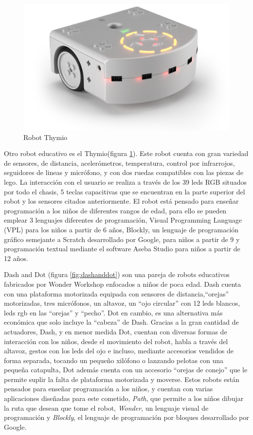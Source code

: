   \begin{figure}[h]
	\centering
	\includegraphics[width=0.6\linewidth]{imagenes/tymio.jpg}
	\caption{Robot Thymio}
	\label{fig:thymio}
\end{figure} 
 Otro robot educativo es el Thymio(figura \ref{fig:thymio}). Este robot cuenta con gran variedad de sensores, de distancia, acelerómetros, temperatura, control por infrarrojos, seguidores de lineas y micrófono, y con dos ruedas compatibles con las piezas de lego. La interacción con el usuario se realiza a través de los 39 leds RGB situados por todo el chasis, 5 teclas capacitivas que se encuentran en la parte superior del robot y los sensores citados anteriormente. El robot está pensado para enseñar programación a los niños de diferentes rangos de edad, para ello se pueden emplear 3 lenguajes diferentes de programación, Visual Programming Language (VPL) para los niños a partir de 6 años, Blockly, un lenguaje de programación gráfico semejante a Scratch desarrollado por Google, para niños a partir de 9 y programación textual mediante el software Aseba Studio para niños a partir de 12 años.
 
 Dash and Dot (figura \ref{fig:dashanddot}) son una pareja de robots educativos fabricados por Wonder Workshop enfocados a niños de poca edad. Dash cuenta con una plataforma motorizada equipada con sensores de distancia,\enquote{orejas} motorizadas, tres micrófonos, un altavoz, un \enquote{ojo circular} con 12 leds blancos, leds rgb en las \enquote{orejas} y \enquote{pecho}. Dot en cambio, es una alternativa más económica que solo incluye la \enquote{cabeza} de Dash. Gracias a la gran cantidad de actuadores, Dash, y en menor medida Dot, cuentan con diversas formas de interacción con los niños, desde el movimiento del robot, habla a través del altavoz,  gestos con los leds del ojo e incluso, mediante accesorios vendidos de forma separada, tocando un pequeño xilófono o lanzando pelotas con una pequeña catapulta, Dot además cuenta con un accesorio \enquote{orejas de conejo} que le permite suplir la falta de plataforma motorizada y moverse. Estos robots están pensados para enseñar programación a los niños, y cuentan con varias aplicaciones diseñadas para este cometido, \textit{Path}, que permite a los niños dibujar la ruta que desean que tome el robot, \textit{Wonder}, un lenguaje visual de programación y \textit{Blockly}, el lenguaje de programación por bloques desarrollado por Google.
 
